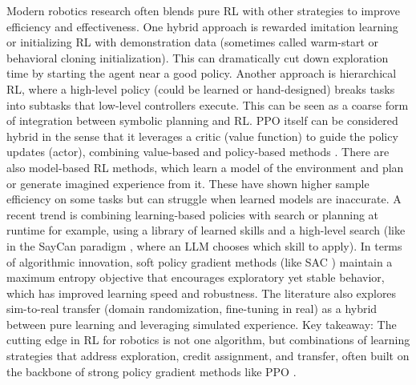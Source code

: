 Modern robotics research often blends pure \ac{RL} with other strategies to improve efficiency and effectiveness. One hybrid approach is rewarded imitation learning or initializing \ac{RL} with demonstration data (sometimes called warm-start or behavioral cloning initialization). This can dramatically cut down exploration time by starting the agent near a good policy. Another approach is hierarchical \ac{RL}, where a high-level policy (could be learned or hand-designed) breaks tasks into subtasks that low-level controllers execute. This can be seen as a coarse form of integration between symbolic planning and \ac{RL}. \ac{PPO} itself can be considered hybrid in the sense that it leverages a critic (value function) to guide the policy updates (actor), combining value-based and policy-based methods \cite{PPO2017}. There are also model-based \ac{RL} methods, which learn a model of the environment and plan or generate imagined experience from it. These have shown higher sample efficiency on some tasks but can struggle when learned models are inaccurate. A recent trend is combining learning-based policies with search or planning at runtime for example, using a library of learned skills and a high-level search (like in the SayCan paradigm \cite{SAYCAN2022}, where an \ac{LLM} chooses which skill to apply). In terms of algorithmic innovation, soft policy gradient methods (like \ac{SAC} \cite{SAC2018}) maintain a maximum entropy objective that encourages exploratory yet stable behavior, which has improved learning speed and robustness. The literature also explores sim-to-real transfer (domain randomization, fine-tuning in real) as a hybrid between pure learning and leveraging simulated experience. Key takeaway: The cutting edge in \ac{RL} for robotics is not one algorithm, but combinations of learning strategies that address exploration, credit assignment, and transfer, often built on the backbone of strong policy gradient methods like \ac{PPO} \cite{PPO2017}.




